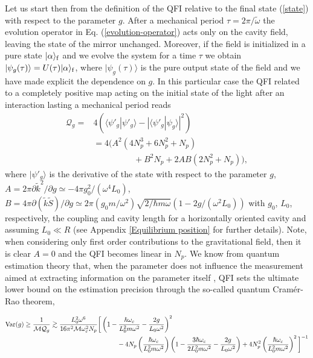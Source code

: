 \documentclass[aps,twocolumn,preprintnumbers,amsmath,amssymb]{revtex4}
\begin{document}
Let us start then from the definition of the QFI relative to the final state (\ref{state}) with respect to the parameter $g$. After a mechanical period $\tau=2\pi/\tilde{\omega}$ the evolution operator in Eq. (\ref{evolution-operator}) acts only on the cavity field, leaving the state of the mirror unchanged. Moreover, if the field is initialized in a pure state $|\alpha\rangle_{\rm f}$ and we evolve the system for a time $\tau$ we obtain $|\psi_g(\tau)\rangle = U(\tau) |\alpha\rangle_{\rm f}$, where $|\psi_g(\tau)\rangle$ is the pure output state of the field and we have made explicit the dependence on $g$. In this particular case the QFI related to a completely positive map acting on the initial state of the light after an interaction lasting a mechanical period reads
\begin{equation}\begin{split}\label{QF}
\mathcal{Q}_g=&4\left(\langle\psi'_{g}|\psi'_{g}\rangle-|\langle\psi'_{g}|\psi_{g}\rangle|^2\right)\\
&=4\big(A^2(4N_p^3+6N_p^2+N_p)\\
&\hspace{2cm}+B^2N_p+2AB(2N_p^2+N_p)\big),
\end{split}\end{equation}
where $|\psi'_{g}\rangle$ is the derivative of the state with respect to the parameter $g$, $A=2\pi \partial \tilde{k}^2/\partial g \simeq -4\pi g_0^2/(\omega^4L_0)$, $B=4 \pi \partial (\tilde{k}\tilde{S})/\partial g \simeq 2\pi (g_0 m/\omega^2)\sqrt{2/\hbar m\omega} \left(1-2g/(\omega^2L_0)\right)$ with $g_0$, $L_0$, respectively, the coupling and cavity length for a horizontally oriented cavity and assuming $L_0\ll R$ (see Appendix \ref{Equilibrium position} for further details). Note, when considering only first order contributions to the gravitational field, then it is clear $A=0$ and the QFI becomes linear in $N_p$. We know from quantum estimation theory that, when the parameter does not influence the measurement aimed at extracting information on the parameter itself \cite{seveso2017}, QFI sets the ultimate lower bound on the estimation precision through the so-called quantum Cram\'er-Rao theorem,
\begin{widetext}
\begin{equation}\begin{split}\label{CRB-t}
{\rm Var}(g)&\geq\frac{1}{\mathcal{M} \mathcal{Q}_g}\gtrsim \frac{L_0^2\omega^{6}}{16\pi^2\mathcal{M}\omega_c^2N_p}\bigg[\left(1-\frac{\hbar\omega_c}{L_0^2m\omega^2}-\frac{2g}{L_0\omega^2}\right)^2\\
&\hspace{5cm}-4N_p\left(\frac{\hbar\omega_c}{L_0^2m\omega^2}\right)\left(1-\frac{3\hbar\omega_c}{2L_0^2m\omega^2}-\frac{2g}{L_0\omega^2}\right)+4N_p^2\left(\frac{\hbar\omega_c}{L_0^2m\omega^2}\right)^2\bigg]^{-1}
\end{split}\end{equation}
\end{widetext}
\end{document}
